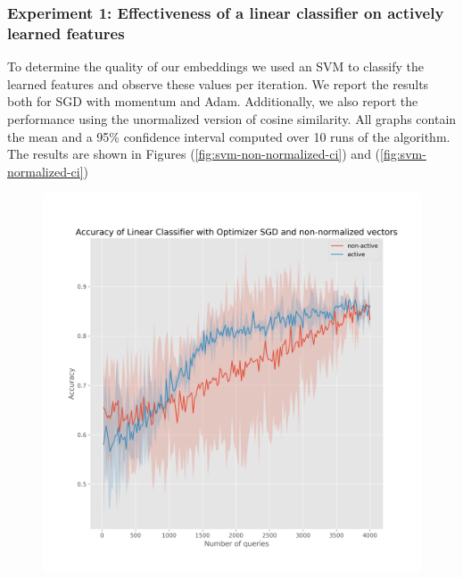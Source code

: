 \documentclass{article}
\begin{document}
\subsubsection{Experiment 1: Effectiveness of a linear classifier on actively learned features}
To determine the quality of our embeddings we used an SVM to classify the learned features and observe these values
per iteration.
We report the results both for SGD with momentum and Adam.
Additionally, we also report the performance using the unormalized version of cosine similarity.
All graphs contain the mean and a 95\% confidence interval computed over 10 runs of the algorithm.
The results are shown in Figures (\ref{fig:svm-non-normalized-ci}) and (\ref{fig:svm-normalized-ci})

\begin{figure}[t]
  \centering
  \begin{minipage}{.45\textwidth}
    \centering
    \includegraphics[width=\linewidth]{active-vs-base-moons-linear-loss-SGD-non-normalized-ci}
  \end{minipage}%
  \begin{minipage}{.45\textwidth}
    \centering

\end{minipage}
\end{figure}
\end{document}
